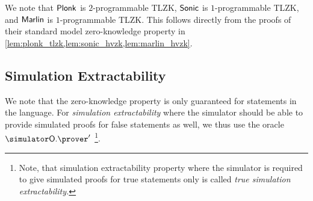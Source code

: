 We note that $\textnormal{\textsf{Plonk}}$ is $2$-programmable TLZK, ${\textnormal{\textsf{Sonic}}}$ is $1$-programmable TLZK,
and ${\textnormal{\textsf{Marlin}}}$ is $1$-programmable TLZK. This follows directly from the proofs of
their standard model zero-knowledge property in
\cref{lem:plonk_tlzk,lem:sonic_hvzk,lem:marlin_hvzk}.

\subsection{Simulation Extractability}
We note that the zero-knowledge property is only guaranteed for statements in the
language.
For \emph{simulation extractability} where the simulator
should be able to provide simulated proofs for false statements as well, we thus use the oracle $\simOP'$
\footnote{Note,
  that simulation extractability property where the simulator is required to give
  simulated proofs for true statements only is called \emph{true simulation
    extractability.}}. 
	
